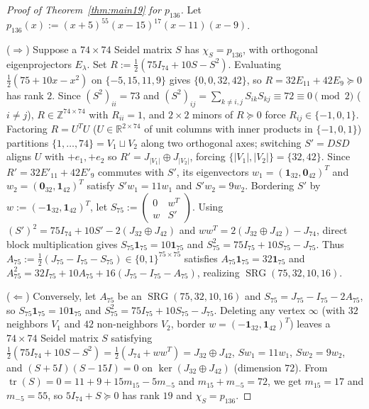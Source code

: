 \documentclass[11pt,reqno]{amsart}
\theoremstyle{definition}
\theoremstyle{remark}
\DeclareMathOperator{\tr}{tr}
\DeclareMathOperator{\SRG}{SRG}
\begin{document}
\begin{proof}[Proof of Theorem~\ref{thm:main19} for $p_{136}$]
Let $p_{136}(x) := (x+5)^{55}(x-15)^{17}(x-11)(x-9)$.

($\Rightarrow$) Suppose a $74 \times 74$ Seidel matrix $S$ has $\chi_S = p_{136}$, with orthogonal eigenprojectors $E_\lambda$. Set $R := \frac{1}{2}(75 I_{74} + 10 S - S^2)$. Evaluating $\frac{1}{2}(75 + 10x - x^2)$ on $\{-5, 15, 11, 9\}$ gives $\{0, 0, 32, 42\}$, so $R = 32 E_{11} + 42 E_9 \succeq 0$ has rank $2$. Since $(S^2)_{ii} = 73$ and $(S^2)_{ij} = \sum_{k \neq i,j} S_{ik}S_{kj} \equiv 72 \equiv 0 \pmod 2$ ($i \neq j$), $R \in \mathbb{Z}^{74 \times 74}$ with $R_{ii} = 1$, and $2 \times 2$ minors of $R \succeq 0$ force $R_{ij} \in \{-1, 0, 1\}$. Factoring $R = U^T U$ ($U \in \mathbb{R}^{2 \times 74}$ of unit columns with inner products in $\{-1, 0, 1\}$) partitions $\{1, \dots, 74\} = V_1 \sqcup V_2$ along two orthogonal axes; switching $S' = DSD$ aligns $U$ with $+e_1, +e_2$ so $R' = J_{|V_1|} \oplus J_{|V_2|}$, forcing $\{|V_1|, |V_2|\} = \{32, 42\}$. Since $R' = 32 E'_{11} + 42 E'_9$ commutes with $S'$, its eigenvectors $w_1 = (\mathbf{1}_{32}, \mathbf{0}_{42})^T$ and $w_2 = (\mathbf{0}_{32}, \mathbf{1}_{42})^T$ satisfy $S' w_1 = 11 w_1$ and $S' w_2 = 9 w_2$. Bordering $S'$ by $w := (-\mathbf{1}_{32}, \mathbf{1}_{42})^T$, let $S_{75} := \left(\begin{smallmatrix} 0 & w^T \\ w & S' \end{smallmatrix}\right)$. Using $(S')^2 = 75I_{74} + 10S' - 2(J_{32} \oplus J_{42})$ and $w w^T = 2(J_{32} \oplus J_{42}) - J_{74}$, direct block multiplication gives $S_{75}\mathbf{1}_{75} = 10\mathbf{1}_{75}$ and $S_{75}^2 = 75I_{75} + 10S_{75} - J_{75}$. Thus $A_{75} := \frac{1}{2}(J_{75} - I_{75} - S_{75}) \in \{0, 1\}^{75 \times 75}$ satisfies $A_{75}\mathbf{1}_{75} = 32\mathbf{1}_{75}$ and $A_{75}^2 = 32I_{75} + 10A_{75} + 16(J_{75} - I_{75} - A_{75})$, realizing $\SRG(75, 32, 10, 16)$.

($\Leftarrow$) Conversely, let $A_{75}$ be an $\SRG(75, 32, 10, 16)$ and $S_{75} = J_{75} - I_{75} - 2A_{75}$, so $S_{75}\mathbf{1}_{75} = 10\mathbf{1}_{75}$ and $S_{75}^2 = 75I_{75} + 10S_{75} - J_{75}$. Deleting any vertex $\infty$ (with $32$ neighbors $V_1$ and $42$ non-neighbors $V_2$, border $w = (-\mathbf{1}_{32}, \mathbf{1}_{42})^T$) leaves a $74 \times 74$ Seidel matrix $S$ satisfying $\frac{1}{2}(75I_{74} + 10S - S^2) = \frac{1}{2}(J_{74} + w w^T) = J_{32} \oplus J_{42}$, $S w_1 = 11 w_1$, $S w_2 = 9 w_2$, and $(S + 5I)(S - 15I) = 0$ on $\ker(J_{32} \oplus J_{42})$ (dimension $72$). From $\tr(S) = 0 = 11 + 9 + 15 m_{15} - 5 m_{-5}$ and $m_{15} + m_{-5} = 72$, we get $m_{15} = 17$ and $m_{-5} = 55$, so $5I_{74} + S \succeq 0$ has rank $19$ and $\chi_S = p_{136}$.
\end{proof}
\end{document}
